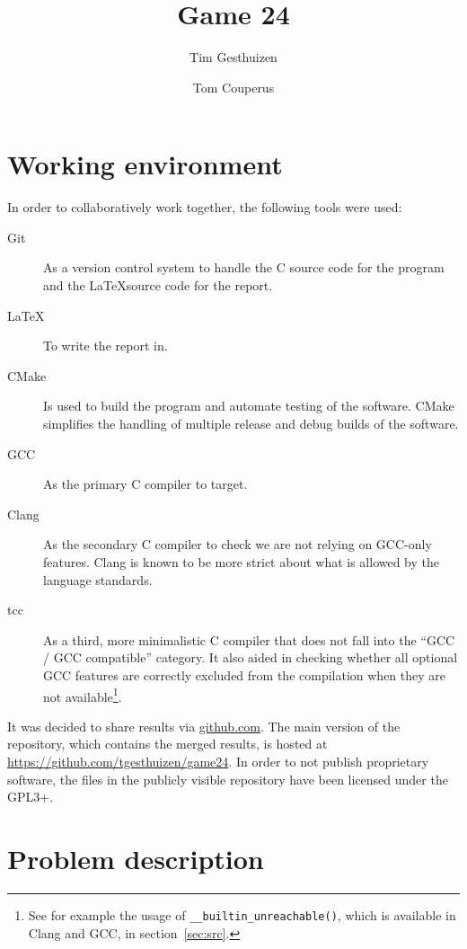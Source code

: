 \documentclass[11pt,a4paper]{article}
\author{Tim Gesthuizen \and Tom Couperus}
\title{Game 24}
\newcommand{\code}[1]{\texttt{#1}}
\begin{document}
\maketitle

\tableofcontents

\clearpage

\section{Working environment}

In order to collaboratively work together, the following tools were
used:

\begin{description}
\item[Git] As a version control system to handle the C source code for
  the program and the \LaTeX source code for the report.
\item[\LaTeX] To write the report in.
\item[CMake] Is used to build the program and automate testing of the
  software. CMake simplifies the handling of multiple release and
  debug builds of the software.
\item[GCC] As the primary C compiler to target.
\item[Clang] As the secondary C compiler to check we are not relying
  on GCC-only features. Clang is known to be more strict about what is
  allowed by the language standards.
\item[tcc] As a third, more minimalistic C compiler that does not fall
  into the ``GCC / GCC compatible'' category. It also aided in
  checking whether all optional GCC features are correctly excluded
  from the compilation when they are not available\footnote{See for
    example the usage of \code{\_\_builtin\_unreachable()}, which is
    available in Clang and GCC, in section~\ref{sec:src}.}.
\end{description}

It was decided to share results via \url{github.com}. The main version
of the repository, which contains the merged results, is hosted at
\url{https://github.com/tgesthuizen/game24}.
In order to not publish proprietary software, the files in the
publicly visible repository have been licensed under the GPL3+.

\section{Problem description}
\end{document}
